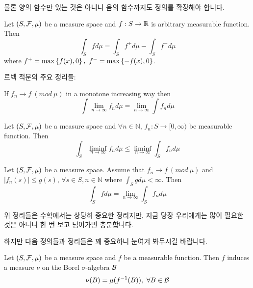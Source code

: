 \documentclass[final]{IEEEphot}
\begin{document}
물론 양의 함수만 있는 것은 아니니 음의 함수까지도 정의를 확장해야 합니다.

\begin{definition}
	Let $(S, \mathcal{F}, \mu)$ be a measure space and $f: S\rightarrow \mathbb{R}$ is arbitrary measurable function. Then
	$$\int_S f d\mu = \int_S f^+ d\mu - \int_S f^- d\mu$$
	where $f^+ = \max\left\{ f(x), 0 \right\},~f^- = \max\left\{ -f(x),0 \right\}$.
	
	\HL 
\end{definition}

\newpage

르벡 적분의 주요 정리들:

\begin{theorem}
	If $f_n \rightarrow f~(mod~\mu)$ in a monotone increasing way then
	$$\int \lim_{n\rightarrow\infty}f_n d\mu = \lim_{n\rightarrow\infty}\int f_n d\mu$$
	
	\HL
\end{theorem}

\begin{theorem}
	Let $(S, \mathcal{F}, \mu)$ be a measure space and $\forall n \in \mathbb{N}$, $f_n : S \rightarrow [0,\infty)$ be measurable function. Then
	$$\int_S \liminf_{n\rightarrow\infty}f_n d\mu \leq \liminf_{n\rightarrow\infty} \int_S f_n d\mu$$
	
	\HL
\end{theorem}

\begin{theorem}
	Let $(S,\mathcal{F},\mu)$ be a measure space. Assume that $f_n \rightarrow f~(mod~\mu)$ and $|f_n(s)| \leq g(s)$, $\forall s \in S, n \in \mathbb{N}$ where $\int_S g d\mu < \infty$. Then
	$$\int_S f d\mu = \lim_{n\rightarrow\infty} \int_S f_n d\mu$$
	
	\HL
\end{theorem}

위 정리들은 수학에서는 상당히 중요한 정리지만, 지금 당장 우리에게는 많이 필요한 것은 아니니 한 번 보고 넘어가면 충분합니다.

\VS

\HS 하지만 다음 정의들과 정리들은 꽤 중요하니 눈여겨 봐두시길 바랍니다.

\begin{definition}
	Let $(S, \mathcal{F}, \mu)$ be a measure space and $f$ be a measurable function. Then $f$ induces a measure $\nu$ on the Borel $\sigma$-algebra $\mathcal{B}$
	$$\nu(B) = \mu(f^{-1}(B)),~ \forall B \in \mathcal{B}$$
	
	\HL
\end{definition}
\end{document}
